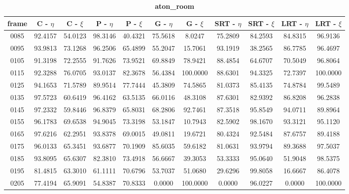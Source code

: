 \begin{appendices}
\begin{table}
\centering
\caption{\textbf{aton\_room}}
\begin{tabular}{ |c|c|c|c|c|c|c|c|c|c|c| }
	\hline
\textbf{frame} &  \textbf{C - $\eta$} &  \textbf{C - $\xi$} &  \textbf{P - $\eta$} &  \textbf{P - $\xi$} &  \textbf{G - $\eta$} &  \textbf{G - $\xi$} &  \textbf{SRT - $\eta$} &  \textbf{SRT - $\xi$} &  \textbf{LRT - $\eta$} &  \textbf{LRT - $\xi$} \\
\hline
\hline
0085 &  92.4157 &  54.0123 &   98.3146 &  40.4321 &   75.5618 &  8.0247 &   75.2809 &  84.2593 &   84.8315 &  96.9136    \\
\hline
0095 &  93.9813 &  73.1268 &   96.2506 &  65.4899 &   55.2047 &  15.7061 &   93.1919 &  38.2565 &   86.7785 &  96.4697    \\
\hline
0105 &  91.3198 &  72.2555 &   91.7626 &  73.9521 &   69.8849 &  78.9421 &   88.4854 &  64.6707 &   70.5049 &  96.8064    \\
\hline
0115 &  92.3288 &  76.0705 &   93.0137 &  82.3678 &   56.4384 &  100.0000 &   88.6301 &  94.3325 &   72.7397 &  100.0000    \\
\hline
0125 &  94.1653 &  71.5789 &   89.9514 &  77.7444 &   45.3809 &  74.5865 &   81.0373 &  85.4135 &   74.8784 &  99.5489    \\
\hline
0135 &  97.5723 &  60.6419 &   96.4162 &  63.5135 &   66.0116 &  48.3108 &   87.6301 &  82.9392 &   86.8208 &  96.2838    \\
\hline
0145 &  97.2332 &  59.8446 &   96.8379 &  65.8031 &   68.2806 &  92.7461 &   87.3518 &  95.8549 &   94.0711 &  89.8964    \\
\hline
0155 &  96.1783 &  69.6538 &   94.9045 &  73.3198 &   53.1847 &  10.7943 &   82.5902 &  98.1670 &   93.3121 &  95.1120    \\
\hline
0165 &  97.6216 &  62.2951 &   93.8378 &  69.0015 &   49.0811 &  19.6721 &   80.4324 &  92.5484 &   87.6757 &  89.4188    \\
\hline
0175 &  96.0133 &  65.3451 &   93.6877 &  70.1909 &   85.6035 &  59.6182 &   81.0631 &  93.9794 &   89.3688 &  97.5037    \\
\hline
0185 &  93.8095 &  65.6307 &   82.3810 &  73.4918 &   56.6667 &  39.3053 &   53.3333 &  95.0640 &   51.9048 &  98.5375    \\
\hline
0195 &  81.4815 &  63.3010 &   61.1111 &  70.6796 &   53.7037 &  51.0680 &   29.6296 &  99.8058 &   16.6667 &  86.4078    \\
\hline
0205 &  77.4194 &  65.9091 &   54.8387 &  70.8333 &   0.0000 &  100.0000 &   0.0000 &  96.0227 &   0.0000 &  100.0000    \\

\end{tabular}
\end{table}
\end{appendices}
